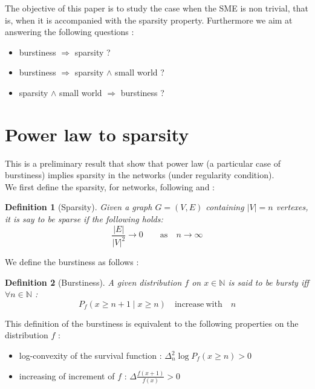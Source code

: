 \documentclass[a4paper, 12pt]{article}
\newtheorem{definition}{Definition}[section]
\begin{document}
The objective of this paper is to study the case when the SME is non trivial, that is, when it is accompanied with the sparsity property. Furthermore we aim at answering the following questions :
\begin{itemize}
    \item burstiness $\Rightarrow$ sparsity ?
    \item burstiness $\Rightarrow$ sparsity  $\wedge$ small world ?
    \item sparsity  $\wedge$ small world $\Rightarrow$ burstiness ?
\end{itemize}

\section{Power law to sparsity}
This is a preliminary result that show that power law (a particular case of burstiness) implies sparsity in the networks (under regularity condition).~\\

We first define the sparsity, for networks, following \cite{orbanz2015bayesian} and \cite{veitch2015class} :
\begin{definition}[Sparsity]
    Given a graph $G = (V,E)$ containing $|V|=n$ vertexes, it is say to be sparse if the following holds:
    \begin{equation}
        \frac{|E|}{|V|^2} \rightarrow 0 \qquad \mathrm{as} \quad  n \rightarrow \infty
    \end{equation}
\end{definition}


We define the burstiness as follows :
\begin{definition}[Burstiness]
    A given distribution $f$ on $x \in \mathbb{N}$ is said to be bursty iff $\forall n \in \mathbb{N} $ :
    \begin{equation}
        P_f(x \geq n+1 \mid x \geq n) \quad  \mathrm{increase\ with} \quad n
    \end{equation}
\end{definition}

This definition of the burstiness is equivalent to the following properties on the distribution $f$ :
\begin{itemize}
    \item log-convexity of the survival function : $\Delta_n^2 \log P_f(x \geq n) > 0$
    \item increasing of increment of $f$ : $\Delta \frac{f(x+1)}{f(x)} > 0$
\end{itemize}
\end{document}
